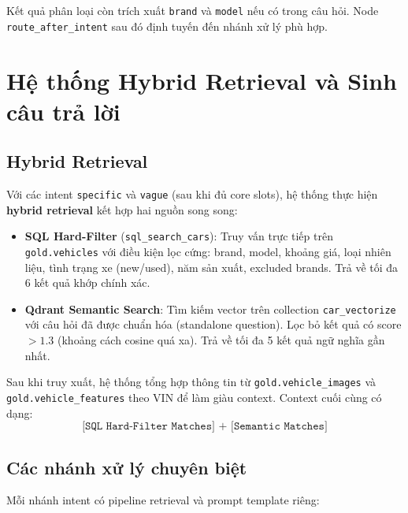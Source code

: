 Kết quả phân loại còn trích xuất \texttt{brand} và \texttt{model} nếu có trong câu hỏi. Node \texttt{route\_after\_intent} sau đó định tuyến đến nhánh xử lý phù hợp.

\section{Hệ thống Hybrid Retrieval và Sinh câu trả lời}

\subsection{Hybrid Retrieval}

Với các intent \texttt{specific} và \texttt{vague} (sau khi đủ core slots), hệ thống thực hiện \textbf{hybrid retrieval} kết hợp hai nguồn song song:

\begin{itemize}
    \item \textbf{SQL Hard-Filter} (\texttt{sql\_search\_cars}): Truy vấn trực tiếp trên \texttt{gold.vehicles} với điều kiện lọc cứng: brand, model, khoảng giá, loại nhiên liệu, tình trạng xe (new/used), năm sản xuất, excluded brands. Trả về tối đa 6 kết quả khớp chính xác.
    \item \textbf{Qdrant Semantic Search}: Tìm kiếm vector trên collection \texttt{car\_vectorize} với câu hỏi đã được chuẩn hóa (standalone question). Lọc bỏ kết quả có score $> 1.3$ (khoảng cách cosine quá xa). Trả về tối đa 5 kết quả ngữ nghĩa gần nhất.
\end{itemize}

Sau khi truy xuất, hệ thống tổng hợp thông tin từ \texttt{gold.vehicle\_images} và \texttt{gold.vehicle\_features} theo VIN để làm giàu context. Context cuối cùng có dạng:
\[
\texttt{[SQL Hard-Filter Matches] + [Semantic Matches]}
\]

\subsection{Các nhánh xử lý chuyên biệt}

Mỗi nhánh intent có pipeline retrieval và prompt template riêng:

